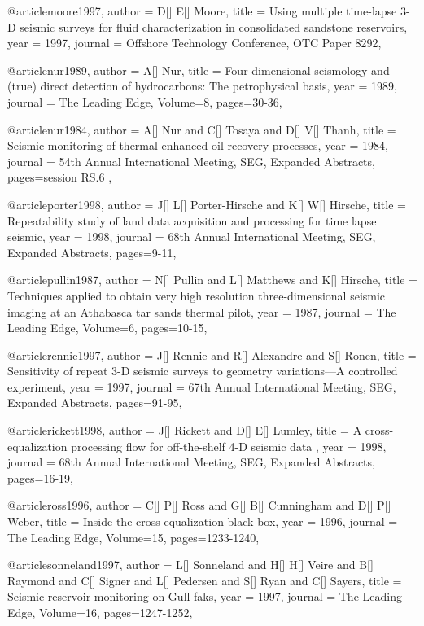 @article{moore1997,
  author =	 {D[] E[] Moore},
  title =	 {Using multiple time-lapse 3-D seismic surveys for
fluid characterization in consolidated sandstone reservoirs},
  year =	 1997,
  journal =	 {Offshore Technology Conference, OTC Paper 8292},
}

@article{nur1989,
  author =	 {A[] Nur},
  title =	 {Four-dimensional seismology and (true) direct detection
of hydrocarbons: The petrophysical basis},
  year =	 1989,
  journal =	 {The Leading Edge},
    Volume=8,
 pages=30-36,
}

@article{nur1984,
  author =	 {A[] Nur and C[] Tosaya and D[] V[] Thanh},
  title =	 {Seismic monitoring of thermal enhanced oil recovery processes},
  year =	 1984,
  journal =	 {54th Annual International Meeting, SEG, Expanded Abstracts},
 pages=session RS.6
,
}

@article{porter1998,
  author =	 {J[] L[] Porter-Hirsche and K[] W[] Hirsche},
  title =	 {Repeatability study of land data acquisition and processing for time lapse seismic},
  year =	 1998,
  journal =	 {68th Annual International Meeting, SEG, Expanded Abstracts},
 pages=9-11,
}

@article{pullin1987,
  author =	 {N[] Pullin and L[] Matthews and K[] Hirsche},
  title =	 {Techniques applied to obtain very high resolution three-dimensional seismic imaging at an Athabasca tar sands thermal pilot},
  year =	 1987,
  journal =	 {The Leading Edge},
    Volume=6,
 pages=10-15,
}

@article{rennie1997,
  author =	 {J[] Rennie and R[] Alexandre and S[] Ronen},
  title =	 { Sensitivity of repeat 3-D seismic surveys to geometry variations—A controlled experiment},
  year =	 1997,
  journal =	 {67th Annual International Meeting, SEG, Expanded Abstracts},
 pages=91-95,
}

@article{rickett1998,
  author =	 {J[] Rickett and D[] E[] Lumley},
  title =	 { A cross-equalization processing flow for off-the-shelf 4-D seismic data },
  year =	 1998,
  journal =	 {68th Annual International Meeting, SEG, Expanded Abstracts},
 pages=16-19,
}

@article{ross1996,
  author =	 {C[] P[] Ross and G[] B[] Cunningham and D[] P[] Weber},
  title =	 {Inside the cross-equalization black box},
  year =	 1996,
  journal =	 {The Leading Edge},
    Volume=15,
 pages=1233-1240,
}

@article{sonneland1997,
  author =	 {L[] Sonneland and H[] H[] Veire and B[] Raymond and C[] Signer and L[] Pedersen and S[] Ryan and C[] Sayers},
  title =	 {Seismic reservoir monitoring on Gull-faks},
  year =	 1997,
  journal =	 {The Leading Edge},
    Volume=16,
 pages=1247-1252,
}


